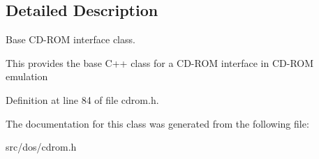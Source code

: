 \subsection{Detailed Description}
Base C\-D-\/\-R\-O\-M interface class. 

This provides the base C++ class for a C\-D-\/\-R\-O\-M interface in C\-D-\/\-R\-O\-M emulation 

Definition at line 84 of file cdrom.\-h.



The documentation for this class was generated from the following file\-:\begin{DoxyCompactItemize}
\item 
src/dos/cdrom.\-h\end{DoxyCompactItemize}
